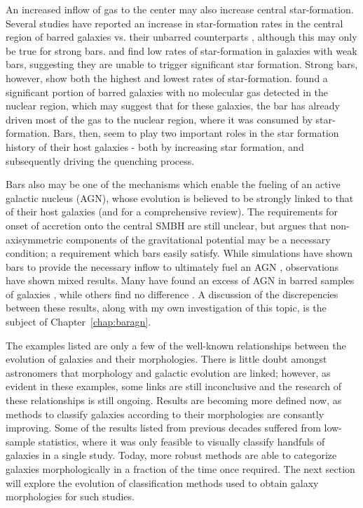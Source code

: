An increased inflow of gas to the center may also increase central star-formation. Several studies have reported an increase in star-formation rates in the central region of barred galaxies vs. their unbarred counterparts \citep{Hawarden1986,Ho1997}, although this may only be true for strong bars. \citet{Martinet1997} and \citet{Zhou2014} find low rates of star-formation in galaxies with weak bars, suggesting they are unable to trigger significant star formation. Strong bars, however, show both the highest and lowest rates of star-formation. \citep{Sheth2005} found a significant portion of barred galaxies with no molecular gas detected in the nuclear region, which may suggest that for these galaxies, the bar has already driven most of the gas to the nuclear region, where it was consumed by star-formation. Bars, then, seem to play two important roles in the star formation history of their host galaxies - both by increasing star formation, and subsequently driving the quenching process.

Bars also may be one of the mechanisms which enable the fueling of an active galactic nucleus (AGN), whose evolution is believed to be strongly linked to that of their host galaxies \citep{Schawinski2007, Schawinski2010, Antonini2015, Yang2017, Zubovas2017} (and \citet{Heckman2014} for a comprehensive review). The requirements for onset of accretion onto the central SMBH are still unclear, but \citet{Moles1995} argues that non-axisymmetric components of the gravitational potential may be a necessary condition; a requirement which bars easily satisfy. While simulations have shown bars to provide the necessary inflow to ultimately fuel an AGN \citep{Athanassoula1992,Friedli1993}, observations have shown mixed results. Many have found an excess of AGN in barred samples of galaxies \citep{Knapen2000,Oh2012}, while others find no difference \citep{Ho1997,Mulchaey1997,Cheung2015}. A discussion of the discrepencies between these results, along with my own investigation of this topic, is the subject of Chapter~\ref{chap:baragn}. 

The examples listed are only a few of the well-known relationships between the evolution of galaxies and their morphologies. There is little doubt amongst astronomers that morphology and galactic evolution are linked; however, as evident in these examples, some links are still inconclusive and the research of these relationships is still ongoing. Results are becoming more defined now, as methods to classify galaxies according to their morphologies are consantly improving. Some of the results listed from previous decades suffered from low-sample statistics, where it was only feasible to visually classify handfuls of galaxies in a single study. Today, more robust methods are able to categorize galaxies morphologically in a fraction of the time once required. The next section will explore the evolution of classification methods used to obtain galaxy morphologies for such studies. 


